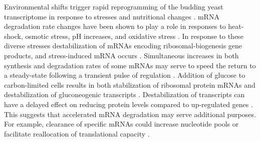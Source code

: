 Environmental shifts trigger rapid reprogramming of the budding yeast
transcriptome in response to stresses and nutritional
changes \parencite{gasch2000genomic,conway2012glucose}. mRNA degradation rate changes
have been shown to play a role in responses to heat-shock, osmotic
stress, pH increases, and oxidative stress
\parencite{castells2011heat,romero2009specific,canadell2015impact,molina2008comprehensive}. 
In response to these
diverse stresses destabilization of mRNAs encoding 
ribosomal-biogenesis gene products, and  
stress-induced mRNA occurs \parencite{canadell2015impact}. 
Simultaneous increases in both synthesis and
degradation rates of some  mRNAs may serve to speed the return to a
steady-state following a transient pulse of regulation
\parencite{shalem2008transient}. Addition of glucose to carbon-limited cells 
results in both stabilization of 
ribosomal protein mRNAs \parencite{yin2003glucose} and destabilization
of gluconeogenic transcripts \parencite{de2002role,mercado1994levels}.
Destabilization of transcripts can
have a delayed effect on reducing protein levels compared to
up-regulated genes \parencite{lee2011dynamic}. This suggests that accelerated
mRNA degradation may serve additional purposes. For example, clearance
of specific mRNAs could increase nucleotide pools
\parencite{kresnowati2006transcriptome} or facilitate reallocation of
translational capacity 
\parencite{kief1981coordinate,giordano2016dynamical,shachrai2010cost}.

